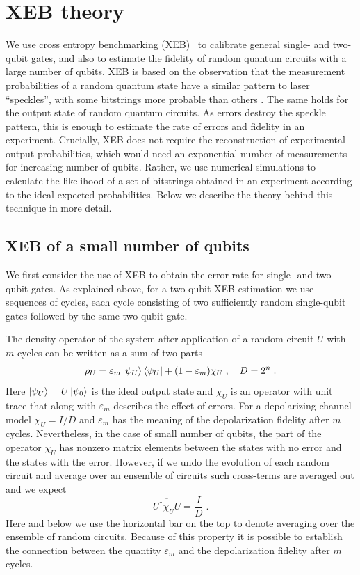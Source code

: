 \section{XEB theory}\label{sec:xeb_theory}

We use cross entropy benchmarking (XEB)~\cite{boixo2018characterizing,neill2018blueprint} to calibrate general single-
and two-qubit gates, and also to estimate the fidelity of random
quantum circuits with a large number of qubits. XEB is based on the
observation that the measurement probabilities of a random quantum
state have a similar pattern to laser ``speckles'', with
some bitstrings more probable than others \cite{wootters1990random, emerson2005}. The same holds for
the output state of random quantum circuits. As errors destroy the speckle
pattern, this is enough to estimate the rate of errors and fidelity in an experiment. Crucially, XEB does not require the reconstruction of
experimental output probabilities, which would need an exponential
number of measurements for increasing number of qubits. Rather, we use
numerical simulations to calculate the likelihood of a set of
bitstrings obtained in an experiment according to the ideal expected
probabilities. Below we describe the theory behind this technique in more
detail.

\subsection{XEB of a small number of qubits}\label{sec:sq}

We first consider the use of XEB to obtain the error rate for single- and two-qubit gates. As explained above, for a two-qubit XEB estimation we use sequences of cycles, each cycle
consisting of two sufficiently random single-qubit gates followed by the same two-qubit gate. 

 The  density operator of the system after application of a random circuit $U$ with $m$ cycles  can be written as a sum of two  parts
\begin{align}
\rho_U  = \varepsilon_m \mathinner{|{\psi_U}\rangle}\mathinner{\langle{\psi_U}|}    + (1- \varepsilon_m)\chi_U\;,\quad D=2^n\;.\label{eq:xeb_ru0}
\end{align}
Here  $\mathinner{|{\psi_U}\rangle}=U \mathinner{|{\psi_0}\rangle}$ is the ideal output state and $\chi_U$ is an operator with unit trace that along with $  \varepsilon_m$ describes the effect of errors. For a depolarizing channel model  $\chi_U=I/D$ and $\varepsilon_m$ has the meaning of the depolarization fidelity after $m$ cycles. Nevertheless, in the case of small number of qubits, the part of the operator $\chi_U$ has nonzero matrix elements between the states with no error and the states with the error. However, if we undo the evolution of each random circuit and average over an ensemble of circuits such cross-terms are  averaged out and we expect
\begin{equation}
\overline{U^{\dagger}\chi_U U}= \frac I D \;.\label{eq:chiu_avg}
\end{equation}
Here and below we use the horizontal bar on the top to denote averaging over the ensemble of random circuits.
Because of this property it is possible to establish the connection between the quantity $\varepsilon_m$ and the depolarization fidelity after $m$ cycles.

